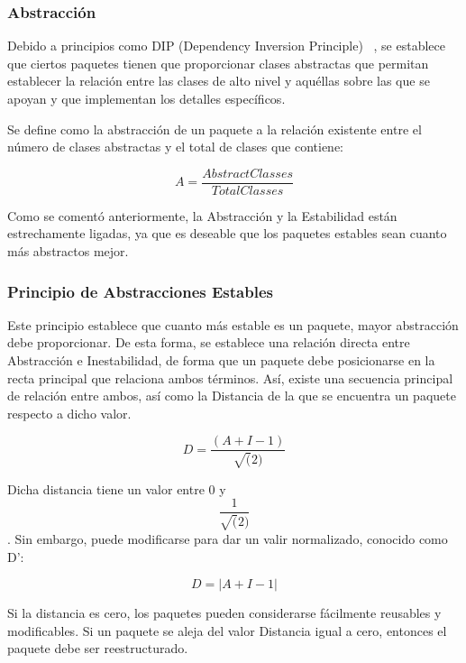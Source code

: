 \documentclass[11pt]{article}
\begin{document}
\subsubsection{Abstracción}
Debido a principios como DIP (Dependency Inversion Principle) ~\cite{unclebob:stabilityandabstraction}, se establece que ciertos paquetes tienen que proporcionar clases abstractas que permitan establecer la relación entre las clases de alto nivel y aquéllas sobre las que se apoyan y que implementan los detalles específicos.

Se define como la abstracción de un paquete a la relación existente entre el número de clases abstractas y el total de clases que contiene:

\begin{equation}
A = \frac{Abstract Classes}{Total Classes}
\end{equation}

Como se comentó anteriormente, la Abstracción y la Estabilidad están estrechamente ligadas, ya que es deseable que los paquetes estables sean cuanto más abstractos mejor.

\subsubsection{Principio de Abstracciones Estables}

Este principio establece que cuanto más estable es un paquete, mayor abstracción debe proporcionar. De esta forma, se establece una relación directa entre Abstracción e Inestabilidad, de forma que un paquete debe posicionarse en la recta principal que relaciona ambos términos. Así, existe una secuencia principal de relación entre ambos, así como la Distancia de la que se encuentra un paquete respecto a dicho valor. 

\begin{equation}
D = \frac{(A+I-1)}{\sqrt(2)}
\end{equation}

Dicha distancia tiene un valor entre 0 y \begin{equation} \frac{1}{\sqrt(2)} \end{equation}. Sin embargo, puede modificarse para dar un valir normalizado, conocido como D':

\begin{equation}
D = |A+I-1|
\end{equation}

Si la distancia es cero, los paquetes pueden considerarse fácilmente reusables y modificables. Si un paquete se aleja del valor Distancia igual a cero, entonces el paquete debe ser reestructurado.
\end{document}
